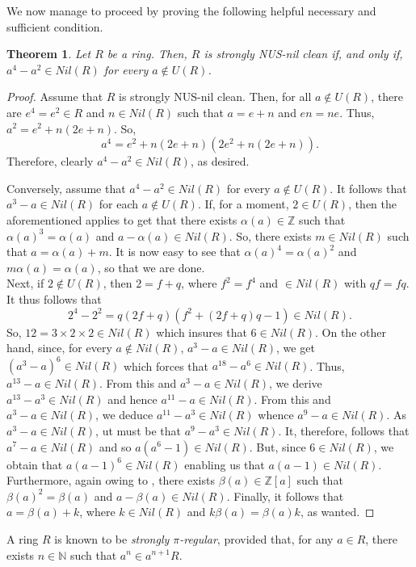 \documentclass[12pt]{amsart}
\newtheorem{theorem}{Theorem}[section]
\theoremstyle{definition}
\begin{document}
\medskip

We now manage to proceed by proving the following helpful necessary and sufficient condition.

\begin{theorem}\label{7} Let $R$ be a ring. Then, $R$ is strongly NUS-nil clean if, and only if, $a^4-a^2\in Nil(R)$ for every $a\not\in U(R)$.
\end{theorem}

\begin{proof} Assume that $R$ is strongly NUS-nil clean. Then, for all $a\not\in U(R)$, there are $e^4=e^2\in R$ and $n\in Nil(R)$ such that $a=e+n$ and $en=ne$. Thus, $a^2=e^2+n(2e+n)$. So, $$a^4=e^2+n(2e+n)(2e^2+n(2e+n)).$$ Therefore, clearly $a^4-a^2\in Nil(R)$, as desired.

Conversely, assume that $a^4-a^2\in Nil(R)$ for every $a\not\in U(R)$. It follows that $a^3-a\in Nil(R)$ for each $a\not\in U(R)$. If, for a moment, $2\in U(R)$, then the aforementioned \cite[Lemma 2.6]{zhou} applies to get that there exists $\alpha (a)\in \mathbb{Z}$ such that $\alpha (a)^3=\alpha(a)$ and $a-\alpha(a)\in Nil(R)$. So, there exists $m\in Nil(R)$ such that $a=\alpha(a)+m$. It is now easy to see that $\alpha(a)^4=\alpha(a)^2$ and $m\alpha(a)=\alpha(a)$, so that we are done.\\

Next, if $2\not\in U(R)$, then $2=f+q$, where $f^2=f^4$ and $\in Nil(R)$ with $qf=fq$. It thus follows that $$2^4-2^2=q(2f+q)(f^2+(2f+q)q-1)\in Nil(R).$$ So, $12=3\times 2\times 2\in Nil(R)$ which insures that $6\in Nil(R)$. On the other hand, since, for every $a\not\in Nil(R)$, $a^3-a\in Nil(R)$, we get $(a^3-a)^6\in Nil(R)$ which forces that $a^{18}-a^6\in Nil(R)$. Thus, $a^{13}-a \in Nil(R)$. From this and $a^3-a\in Nil(R)$, we derive $a^{13}-a^3\in Nil(R)$ and hence $a^{11}-a\in Nil(R)$. From this and $a^3-a\in Nil(R)$, we deduce $a^{11}-a^3\in Nil(R)$ whence $a^9-a\in Nil(R)$. As $a^3-a\in Nil(R)$, ut must be that $a^9-a^3\in Nil(R)$. It, therefore, follows that $a^7-a\in Nil(R)$ and so $a(a^6-1)\in Nil(R)$. But, since $6\in Nil(R)$, we obtain that $a(a-1)^6\in Nil(R)$ enabling us that $a(a-1)\in Nil(R)$. Furthermore, again owing to \cite[Lemma 2.6]{zhou}, there exists $\beta(a)\in \mathbb{Z}[a]$ such that $\beta (a)^2=\beta(a)$ and $a-\beta(a)\in Nil(R)$. Finally, it follows that $a=\beta(a)+k$, where $k\in Nil(R)$ and $k\beta(a)=\beta(a)k$, as wanted.
\end{proof}

A ring $R$ is known to be {\it strongly $\pi$-regular}, provided that, for any $a \in R$, there exists $n \in \mathbb{N}$ such that $a^n \in a^{n+1}R$.
\end{document}
